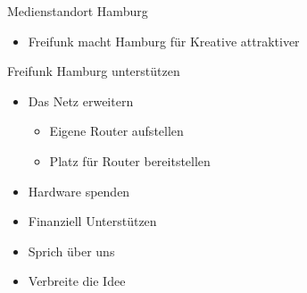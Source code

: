 \documentclass[c]{beamer}
\begin{document}
\begin{frame}{Medienstandort Hamburg}
	\begin{itemize}
		\item Freifunk macht Hamburg für Kreative attraktiver
	\end{itemize}
\end{frame}

\begin{frame}{Freifunk Hamburg unterstützen}
	\begin{itemize}
		\item Das Netz erweitern
		\begin{itemize}
			\item Eigene Router aufstellen
			\item Platz für Router bereitstellen
		\end{itemize}
		\item Hardware spenden
		\item Finanziell Unterstützen
		\item Sprich über uns
		\item Verbreite die Idee
	\end{itemize}
\end{frame}
\end{document}
